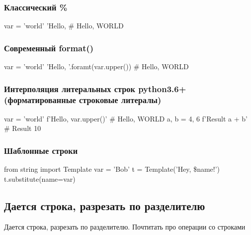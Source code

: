 \subsubsection{Классический \%}

\begin{python}
var = 'world'
'Hello, %
# Hello, WORLD 
\end{python}

\subsubsection{Современный format()}

\begin{python}
var = 'world'
'Hello, {}'.foramt(var.upper())
# Hello, WORLD 
\end{python}

\subsubsection{Интерполяция литеральных строк python3.6+ (форматированные строковые литералы)}

\begin{python}
var = 'world'
f'Hello, {var.upper()}'
# Hello, WORLD
a, b = 4, 6
f'Result {a + b}'
# Result 10
\end{python}

\subsubsection{Шаблонные строки}

\begin{python}
from string import Template
var = 'Bob'
t = Template('Hey, \$name!')
t.substitute(name=var)
\end{python}

\subsection{Дается строка, разрезать по разделителю}

	Дается строка, разрезать по разделителю. Почтитать про операции со строками
	
